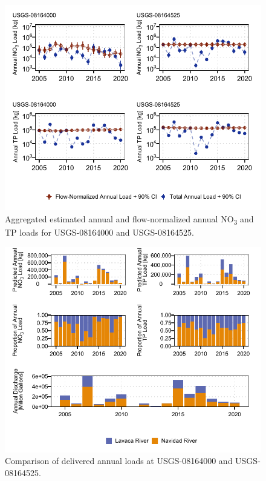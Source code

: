 \documentclass[water,article,submit,oneauthor]{Definitions/mdpi}
\begin{document}
\begin{figure}

{\centering \includegraphics[width=1\linewidth]{Schramm-Manuscript-2023_files/figure-latex/fig3-1} 

}

\caption[Aggregated estimated annual and flow-normalized annual NO\textsubscript{3} and TP loads for USGS-08164000 and USGS-08164525]{Aggregated estimated annual and flow-normalized annual NO\textsubscript{3} and TP loads for USGS-08164000 and USGS-08164525.}\label{fig:fig3}
\end{figure}

\begin{figure}

{\centering \includegraphics[width=1\linewidth]{Schramm-Manuscript-2023_files/figure-latex/fig4-1} 

}

\caption[Comparison of delivered annual loads at USGS-08164000 and USGS-08164525]{Comparison of delivered annual loads at USGS-08164000 and USGS-08164525.}\label{fig:fig4}
\end{figure}
\end{document}
